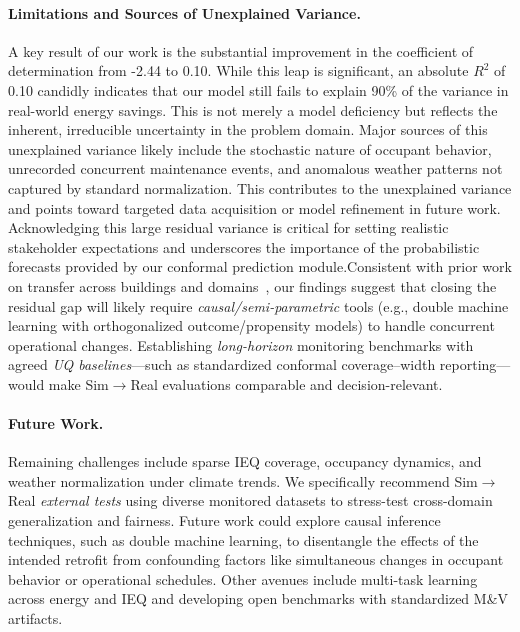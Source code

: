 ﻿\documentclass{article}
\begin{document}
\paragraph{Limitations and Sources of Unexplained Variance.}
A key result of our work is the substantial improvement in the coefficient of determination from -2.44 to 0.10. While this leap is significant, an absolute $R^2$ of 0.10 candidly indicates that our model still fails to explain 90\% of the variance in real-world energy savings. This is not merely a model deficiency but reflects the inherent, irreducible uncertainty in the problem domain. Major sources of this unexplained variance likely include the stochastic nature of occupant behavior, unrecorded concurrent maintenance events, and anomalous weather patterns not captured by standard normalization. This contributes to the unexplained variance and points toward targeted data acquisition or model refinement in future work. Acknowledging this large residual variance is critical for setting realistic stakeholder expectations and underscores the importance of the probabilistic forecasts provided by our conformal prediction module.Consistent with prior work on transfer across buildings and domains~\citep{hong2020transfer,mahnke2022transfer}, our findings suggest that closing the residual gap will likely require \emph{causal/semi-parametric} tools (e.g., double machine learning with orthogonalized outcome/propensity models) to handle concurrent operational changes. Establishing \emph{long-horizon} monitoring benchmarks with agreed \emph{UQ baselines}—such as standardized conformal coverage–width reporting—would make Sim$\rightarrow$Real evaluations comparable and decision-relevant.


\paragraph{Future Work.} Remaining challenges include sparse IEQ coverage, occupancy dynamics, and weather normalization under climate trends. We specifically recommend Sim$\rightarrow$Real \emph{external tests} using diverse monitored datasets to stress-test cross-domain generalization and fairness.
Future work could explore causal inference techniques, such as double machine learning, to disentangle the effects of the intended retrofit from confounding factors like simultaneous changes in occupant behavior or operational schedules. Other avenues include multi-task learning across energy and IEQ and developing open benchmarks with standardized M\&V artifacts.
\end{document}
